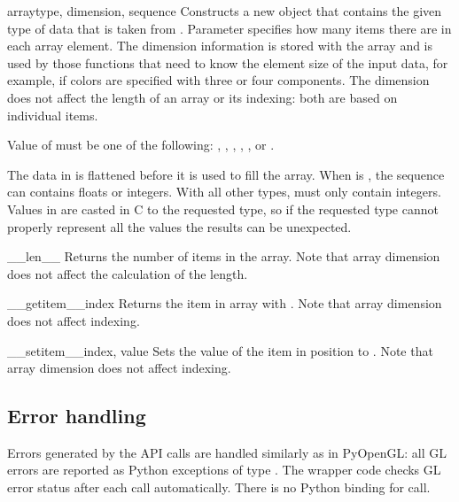 \begin{classdesc}{array}{type, dimension, sequence}
Constructs a new  object that contains the given type of data that
is taken from . Parameter  specifies how many items
there are in each array element. The dimension information is stored with the
array and is used by those functions that need to know the element size of the
input data, for example, if colors are specified with three or four
components. The dimension does not affect the length of an array or its
indexing: both are based on individual items.

Value of  must be one of the following:
, , , ,
, or .

The data in  is flattened before it is used to fill the
array. When  is , the sequence can contains floats or
integers. With all other types,  must only contain
integers. Values in  are casted in C to the requested type, so if
the requested type cannot properly represent all the values the results can be
unexpected.

\begin{methoddesc}[array]{__len__}{}
Returns the number of items in the array. Note that array dimension does not
affect the calculation of the length.
\end{methoddesc}

\begin{methoddesc}[array]{__getitem__}{index}
Returns the item in array with . Note that array dimension does not
affect indexing.
\end{methoddesc}

\begin{methoddesc}[array]{__setitem__}{index, value}
Sets the value of the item in position  to . Note that
array dimension does not affect indexing.
\end{methoddesc}
\end{classdesc}

\subsection{Error handling}

Errors generated by the API calls are handled similarly as in PyOpenGL: all GL
errors are reported as Python exceptions of type . The
wrapper code checks GL error status after each call automatically. There is no
Python binding for  call.

